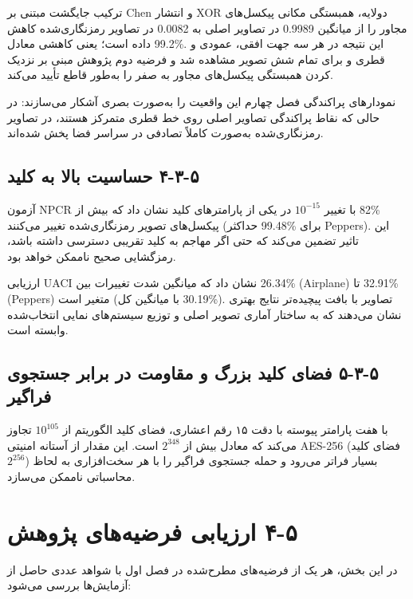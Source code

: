 ترکیب جایگشت مبتنی بر Chen و انتشار XOR دولایه، همبستگی مکانی پیکسل‌های مجاور را از میانگین 0.9989 در تصاویر اصلی به 0.0082 در تصاویر رمزنگاری‌شده کاهش داده است؛ یعنی کاهشی معادل ‎99.2\%. این نتیجه در هر سه جهت افقی، عمودی و قطری و برای تمام شش تصویر مشاهده شد و فرضیه دوم پژوهش مبنی بر نزدیک کردن همبستگی پیکسل‌های مجاور به صفر را به‌طور قاطع تأیید می‌کند.

نمودارهای پراکندگی فصل چهارم این واقعیت را به‌صورت بصری آشکار می‌سازند: در حالی که نقاط پراکندگی تصاویر اصلی روی خط قطری متمرکز هستند، در تصاویر رمزنگاری‌شده به‌صورت کاملاً تصادفی در سراسر فضا پخش شده‌اند.

\subsection{‏۵‏-‏۳‏-‏۴‏ حساسیت بالا به کلید}

آزمون NPCR با تغییر $10^{-15}$ در یکی از پارامترهای کلید نشان داد که بیش از ‎82\%‎ پیکسل‌های تصویر رمزنگاری‌شده تغییر می‌کنند (حداکثر ‎99.48\%‎ برای Peppers). این تاثیر  تضمین می‌کند که حتی اگر مهاجم به کلید تقریبی دسترسی داشته باشد، رمزگشایی صحیح ناممکن خواهد بود.

ارزیابی UACI نشان داد که میانگین شدت تغییرات بین ‎26.34\%‎ (Airplane) تا ‎32.91\%‎ (Peppers) متغیر است (با میانگین کل ‎30.19\%‎). تصاویر با بافت پیچیده‌تر نتایج بهتری نشان می‌دهند که به ساختار آماری تصویر اصلی و توزیع سیستم‌های نمایی انتخاب‌شده وابسته است.

\subsection{‏۵‏-‏۳‏-‏۵‏ فضای کلید بزرگ و مقاومت در برابر جستجوی فراگیر}

با هفت پارامتر پیوسته با دقت ۱۵ رقم اعشاری، فضای کلید الگوریتم از $10^{105}$ تجاوز می‌کند که معادل بیش از $2^{348}$ است.  این مقدار از آستانه امنیتی AES-256 (فضای کلید $2^{256}$) بسیار فراتر می‌رود و حمله جستجوی فراگیر را با هر سخت‌افزاری به لحاظ محاسباتی ناممکن می‌سازد.

\section{‏۵‏-‏۴‏ ارزیابی فرضیه‌های پژوهش}

در این بخش، هر یک از فرضیه‌های مطرح‌شده در فصل اول با شواهد عددی حاصل از آزمایش‌ها بررسی می‌شود:

